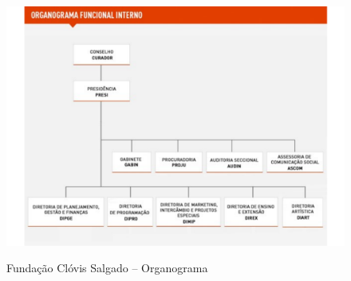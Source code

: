 \documentclass[a4paper, 12pt, openright, oneside, german, french, english, brazil]{abntex2}
\begin{document}
	\begin{figure}[ht]
		\centering
		\caption{Fundação Clóvis Salgado -- Organograma}
		\includegraphics[scale=0.57]{organogramaFCSred.pdf}
		\label{fcsorg}
	\end{figure}
	
\end{document}
